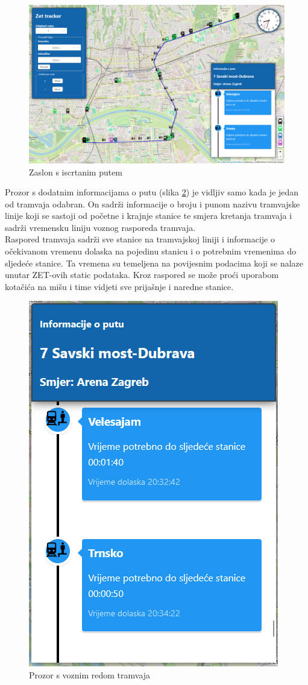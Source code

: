 \documentclass[zavrsnirad]{fer}
\begin{document}
\begin{figure}[H]
	\centering
	\includegraphics[width=\linewidth]{Figures/primjer1.png} 
	\caption{Zaslon s iscrtanim putem}
	\label{slk:put}
\end{figure}
\newpage
Prozor s dodatnim informacijama o putu (slika \ref{slk:inf}) je vidljiv samo kada je jedan od tramvaja odabran. On sadrži informacije o broju i punom nazivu tramvajske linije koji se sastoji od početne i krajnje stanice te smjera kretanja tramvaja i sadrži vremensku liniju voznog rasporeda tramvaja.\\

Raspored tramvaja sadrži sve stanice na tramvajskoj liniji i informacije o očekivanom vremenu dolaska na pojedinu stanicu i o potrebnim vremenima do sljedeće stanice. Ta vremena su temeljena na povijesnim podacima koji se nalaze unutar ZET-ovih static podataka. Kroz raspored se može proći uporabom kotačića na mišu i time vidjeti sve prijašnje i naredne stanice.

\begin{figure}[H]
	\centering
	\includegraphics[width=0.4\linewidth]{Figures/informacije.png} 
	\caption{Prozor s voznim redom tramvaja}
	\label{slk:inf}
\end{figure}
\end{document}
